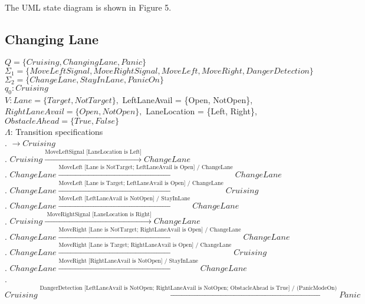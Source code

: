 \documentclass[12pt]{article}
\begin{document}
\begin{spacing}{1.5}
\noindent The UML state diagram is shown in Figure 5.

\newpage
\subsection{Changing Lane}

\noindent $Q = \{Cruising, ChangingLane, Panic\}$\\
\noindent $\Sigma_1 = \{MoveLeftSignal, MoveRightSignal, MoveLeft, MoveRight, DangerDetection\}$\\
\noindent $\Sigma_2 = \{ChangeLane, StayInLane, PanicOn\}$\\
\noindent $q_0: Cruising$\\
\noindent $V: Lane = \{Target, NotTarget\}, $ LeftLaneAvail  = \{Open, NotOpen\}, $ RightLaneAvail  = \{Open, NotOpen\}, $ LaneLocation  = \{Left, Right\}, $ ObstacleAhead  = \{True, False\}$\\
\noindent $\Lambda$: Transition specifications\\

. $\rightarrow Cruising$\\
. $Cruising \xrightarrow {\text {MoveLeftSignal [LaneLocation is Left]}} ChangeLane$\\
. $ChangeLane \xrightarrow {\text {MoveLeft [Lane is NotTarget; LeftLaneAvail is Open] / ChangeLane}} ChangeLane$\\
. $ChangeLane \xrightarrow {\text {MoveLeft [Lane is Target; LeftLaneAvail is Open] / ChangeLane}} Cruising$\\
. $ChangeLane \xrightarrow {\text {MoveLeft [LeftLaneAvail  is NotOpen] / StayInLane}} ChangeLane$\\
. $Cruising \xrightarrow {\text { MoveRightSignal [LaneLocation is Right]}} ChangeLane$\\
. $ChangeLane \xrightarrow {\text {MoveRight [Lane is NotTarget; RightLaneAvail is Open] / ChangeLane}} ChangeLane$\\
. $ChangeLane \xrightarrow {\text {MoveRight [Lane is Target; RightLaneAvail is Open] / ChangeLane}} Cruising$\\
. $ChangeLane \xrightarrow {\text {MoveRight [RightLaneAvail is NotOpen] / StayInLane}} ChangeLane$\\
. $Cruising \xrightarrow {\text {DangerDetection [LeftLaneAvail is NotOpen; RightLaneAvail is NotOpen; ObstacleAhead is True] / (PanicModeOn)}} Panic$\\


\end{spacing}
\end{document}

